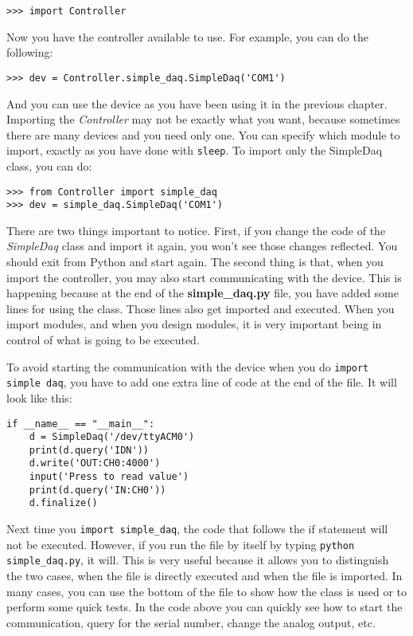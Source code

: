\begin{verbatim}
>>> import Controller
\end{verbatim}

Now you have the controller available to use. For example, you can do
the following:

\begin{verbatim}
>>> dev = Controller.simple_daq.SimpleDaq('COM1')
\end{verbatim}

And you can use the device as you have been using it in the previous
chapter. Importing the \emph{Controller} may not be exactly what you
want, because sometimes there are many devices and you need only one.
You can specify which module to import, exactly as you have done with
\texttt{sleep}. To import only the SimpleDaq class, you can do:

\begin{verbatim}
>>> from Controller import simple_daq
>>> dev = simple_daq.SimpleDaq('COM1')
\end{verbatim}

There are two things important to notice. First, if you change the code
of the \emph{SimpleDaq} class and import it again, you won't see those
changes reflected. You should exit from Python and start again. The
second thing is that, when you import the controller, you may also start
communicating with the device. This is happening because at the end of
the \textbf{simple\_daq.py} file, you have added some lines for using
the class. Those lines also get imported and executed. When you import
modules, and when you design modules, it is very important being in
control of what is going to be executed.

To avoid starting the communication with the device when you do
\texttt{import simple daq}, you have to add one extra line of code at
the end of the file. It will look like this:

\begin{verbatim}
if __name__ == "__main__":
    d = SimpleDaq('/dev/ttyACM0')
    print(d.query('IDN'))
    d.write('OUT:CH0:4000')
    input('Press to read value')
    print(d.query('IN:CH0'))
    d.finalize()
\end{verbatim}

Next time you \texttt{import simple_daq}, the code that follows the if statement
will not be executed. However, if you run the file by itself by typing
\texttt{python simple_daq.py}, it will. This is very useful because it
allows you to distinguish the two cases, when the file is directly
executed and when the file is imported. In many cases, you can use the
bottom of the file to show how the class is used or to perform some
quick tests. In the code above you can quickly see how to start the
communication, query for the serial number, change the analog
output, etc.

